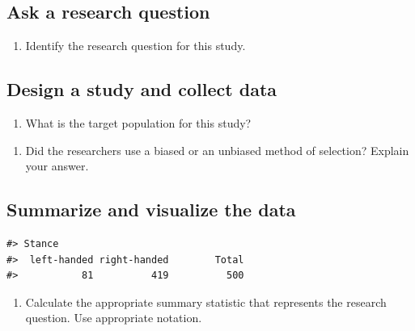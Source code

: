 \documentclass[
]{report}
\providecommand{\tightlist}{%
  \setlength{\itemsep}{0pt}\setlength{\parskip}{0pt}}
\begin{document}
\vspace{0.5in}

\hypertarget{ask-a-research-question}{%
\subsection{Ask a research question}\label{ask-a-research-question}}

\begin{enumerate}
\def\labelenumi{\arabic{enumi}.}
\setcounter{enumi}{4}
\tightlist
\item
  Identify the research question for this study.
\end{enumerate}

\vspace{1in}

\hypertarget{design-a-study-and-collect-data}{%
\subsection{Design a study and collect data}\label{design-a-study-and-collect-data}}

\begin{enumerate}
\def\labelenumi{\arabic{enumi}.}
\setcounter{enumi}{5}
\tightlist
\item
  What is the target population for this study?
\end{enumerate}

\vspace{0.5in}

\begin{enumerate}
\def\labelenumi{\arabic{enumi}.}
\setcounter{enumi}{6}
\tightlist
\item
  Did the researchers use a biased or an unbiased method of selection? Explain your answer.
\end{enumerate}

\vspace{1in}

\hypertarget{summarize-and-visualize-the-data}{%
\subsection{Summarize and visualize the data}\label{summarize-and-visualize-the-data}}

\begin{verbatim}
#> Stance
#>  left-handed right-handed        Total 
#>           81          419          500
\end{verbatim}

\begin{enumerate}
\def\labelenumi{\arabic{enumi}.}
\setcounter{enumi}{7}
\tightlist
\item
  Calculate the appropriate summary statistic that represents the research question. Use appropriate notation.
\end{enumerate}
\end{document}
